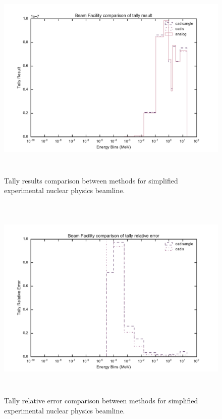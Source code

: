 \begin{figure}[h!]
  \centering
  \includegraphics[height=10cm]{./chapters/characterization_probs/figures/char/beam/beam_facility_tally_result_compare.pdf}
  \caption[Tally results comparison between methods for simplified experimental
    nuclear physics beamline.]
  {Tally results comparison between methods for simplified experimental
    nuclear physics beamline.}
  \label{fig:beamresult}
\end{figure}

\begin{figure}[h!]
  \centering
  \includegraphics[height=10cm]{./chapters/characterization_probs/figures/char/beam/beam_facility_tally_error_compare.pdf}
  \caption[Tally relative error comparison between methods
    for simplified experimental nuclear physics beamline.]
  {Tally relative error comparison between methods for simplified experimental
    nuclear physics beamline.}
  \label{fig:beamerror}
\end{figure}

